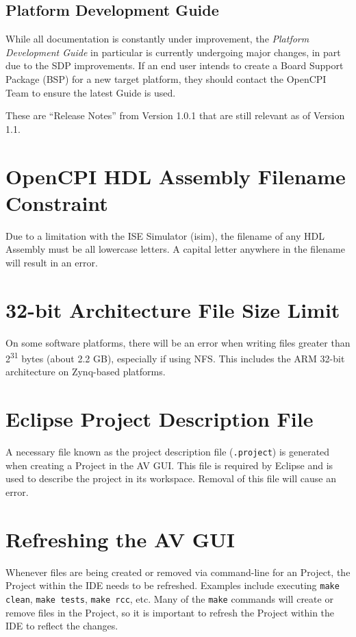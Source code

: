 \subsection{Platform Development Guide}
\label{bug:1585}
While all documentation is constantly under improvement, the \textit{Platform Development Guide} in particular is currently undergoing major changes, in part due to the SDP improvements. If an end user intends to create a Board Support Package (BSP) for a new target platform, they should contact the OpenCPI Team to ensure the latest Guide is used.


\newpage
{}
\def\ocpiversion{v1.0.0}  %
\label{sec:101}
These are ``Release Notes'' from Version 1.0.1 that are still relevant as of Version 1.1.
\section{OpenCPI HDL Assembly Filename Constraint}
\label{bug:1035}
Due to a limitation with the ISE Simulator (isim), the filename of any HDL Assembly must be all lowercase letters. A capital letter anywhere in the filename will result in an error.

\section{32-bit Architecture File Size Limit}
\label{bug:693}
On some software platforms, there will be an error when writing files greater than 2\textsuperscript{31} bytes (about 2.2 GB), especially if using NFS. This includes the ARM 32-bit architecture on Zynq-based platforms.

\section{Eclipse Project Description File}
A necessary file known as the project description file (\verb+.project+) is generated when creating a Project in the AV GUI. This file is required by Eclipse and is used to describe the project in its workspace. Removal of this file will cause an error.

\section{Refreshing the AV GUI}
Whenever files are being created or removed via command-line for an Project, the Project within the IDE needs to be refreshed. Examples include executing \verb+make clean+, \verb+make tests+, \verb+make rcc+, etc. Many of the \verb+make+ commands will create or remove files in the Project, so it is important to refresh the Project within the IDE to reflect the changes.

